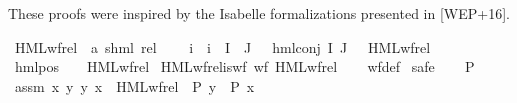 \begin{isabellebody}
\begin{isamarkuptext}
These proofs were inspired by the Isabelle formalizations presented in [WEP+16].%
\end{isamarkuptext}\isamarkuptrue%
\isamarkupfalse%
\ HML{\isacharunderscore}{\kern0pt}wf{\isacharunderscore}{\kern0pt}rel\ {\isacharcolon}{\kern0pt}{\isacharcolon}{\kern0pt}\ {\isachardoublequoteopen}{\isacharparenleft}{\kern0pt}{\isacharparenleft}{\kern0pt}{\isacharprime}{\kern0pt}a{\isacharcomma}{\kern0pt}\ {\isacharprime}{\kern0pt}s{\isacharparenright}{\kern0pt}hml{\isacharparenright}{\kern0pt}\ rel{\isachardoublequoteclose}\ \isanewline
{\isachardoublequoteopen}{\isasymphi}\ {\isacharequal}{\kern0pt}\ {\isasymPhi}\ i\ {\isasymand}\ i\ {\isasymin}\ {\isacharparenleft}{\kern0pt}I\ {\isasymunion}\ J{\isacharparenright}{\kern0pt}\ {\isasymLongrightarrow}\ {\isacharparenleft}{\kern0pt}{\isasymphi}{\isacharcomma}{\kern0pt}\ {\isacharparenleft}{\kern0pt}hml{\isacharunderscore}{\kern0pt}conj\ I\ J\ {\isasymPhi}{\isacharparenright}{\kern0pt}{\isacharparenright}{\kern0pt}\ {\isasymin}\ HML{\isacharunderscore}{\kern0pt}wf{\isacharunderscore}{\kern0pt}rel{\isachardoublequoteclose}\ {\isacharbar}{\kern0pt}\isanewline
{\isachardoublequoteopen}{\isacharparenleft}{\kern0pt}{\isasymphi}{\isacharcomma}{\kern0pt}\ {\isacharparenleft}{\kern0pt}hml{\isacharunderscore}{\kern0pt}pos\ {\isasymalpha}\ {\isasymphi}{\isacharparenright}{\kern0pt}{\isacharparenright}{\kern0pt}\ {\isasymin}\ HML{\isacharunderscore}{\kern0pt}wf{\isacharunderscore}{\kern0pt}rel{\isachardoublequoteclose}\isanewline
\isanewline
{}\isamarkupfalse%
\ HML{\isacharunderscore}{\kern0pt}wf{\isacharunderscore}{\kern0pt}rel{\isacharunderscore}{\kern0pt}is{\isacharunderscore}{\kern0pt}wf{\isacharcolon}{\kern0pt}\ {\isacartoucheopen}wf\ HML{\isacharunderscore}{\kern0pt}wf{\isacharunderscore}{\kern0pt}rel{\isacartoucheclose}\isanewline
%
\isadelimproof
\ \ %
\endisadelimproof
%
\isatagproof
{}\isamarkupfalse%
\ wf{\isacharunderscore}{\kern0pt}def\isanewline
{}\isamarkupfalse%
\ safe\isanewline
\ \ \isamarkupfalse%
\ P\isanewline
\ \ \isamarkupfalse%
\ assm{\isacharcolon}{\kern0pt}\ {\isachardoublequoteopen}{\isasymforall}x{\isachardot}{\kern0pt}\ {\isacharparenleft}{\kern0pt}{\isasymforall}y{\isachardot}{\kern0pt}\ {\isacharparenleft}{\kern0pt}y{\isacharcomma}{\kern0pt}\ x{\isacharparenright}{\kern0pt}\ {\isasymin}\ HML{\isacharunderscore}{\kern0pt}wf{\isacharunderscore}{\kern0pt}rel\ {\isasymlongrightarrow}\ P\ y{\isacharparenright}{\kern0pt}\ {\isasymlongrightarrow}\ P\ x{\isachardoublequoteclose}\isanewline

\end{isabellebody}
